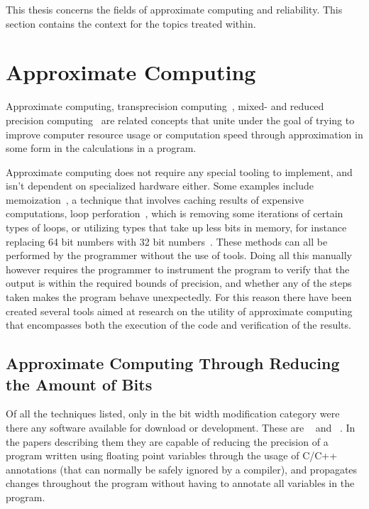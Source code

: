 
This thesis concerns the fields of approximate computing and reliability. This section contains the context for the topics treated within. 

\section{Approximate Computing}
Approximate computing, transprecision computing~\citep{malossi2018transprecision}, mixed- and reduced precision computing~\citep{cherubin2019taffo} are related concepts that unite under the goal of trying to improve computer resource usage or computation speed through approximation in some form in the calculations in a program. 

Approximate computing does not require any special tooling to implement, and isn't dependent on specialized hardware either. Some examples include memoization~\citep{mittal2016survey}, a technique that involves caching results of expensive computations,  loop perforation~\citep{li2018sculptor}, which is removing some iterations of certain types of loops, or utilizing types that take up less bits in memory, for instance replacing 64 bit numbers with 32 bit numbers~\citep{cherubin2019taffo, tagliavini2018flexfloat, floatsmith_paper}. These methods can all be performed by the programmer without the use of tools. Doing all this manually however requires the programmer to instrument the program to verify that the output is within the required bounds of precision, and whether any of the steps taken makes the program behave unexpectedly. For this reason there have been created several tools aimed at research on the utility of approximate computing that encompasses both the execution of the code and verification of the results. 

\subsection{Approximate Computing Through Reducing the Amount of Bits}
\label{section:approximate_computing_through_reducing_bits}

Of all the techniques listed, only in the bit width modification category were there any software available for download or development. These are \floatsmith{}~\citep{floatsmith_paper} and \taffo{}~\citep{cherubin2019taffo}. In the papers describing them they are capable of reducing the precision of a program written using floating point variables through the usage of C/C++ annotations (that can normally be safely ignored by a compiler), and propagates changes throughout the program without having to annotate all variables in the program.

